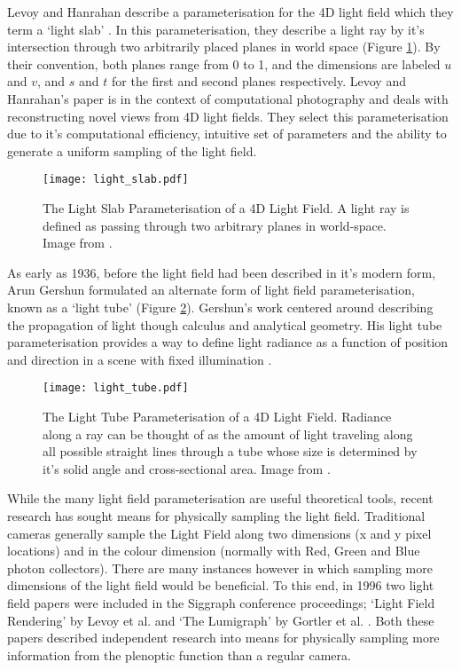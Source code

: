 Levoy and Hanrahan describe a parameterisation for the 4D light field which they term a \enquote*{light slab} \cite{levoy1996light}.
In this parameterisation, they describe a light ray by it's intersection through two arbitrarily placed planes in world space (Figure \ref{fig:light_slab}).
By their convention, both planes range from 0 to 1, and the dimensions are labeled $u$ and $v$, and $s$ and $t$ for the first and second planes respectively.
Levoy and Hanrahan's paper is in the context of computational photography and deals with reconstructing novel views from 4D light fields.
They select this parameterisation due to it's computational efficiency, intuitive set of parameters and the ability to generate a uniform sampling of the light field.

\begin{figure}[h]
\centering
\texttt{[image: light\_slab.pdf]}
\caption[The Light Slab Parameterisation of a 4D Light Field]{
The Light Slab Parameterisation of a 4D Light Field.
A light ray is defined as passing through two arbitrary planes in world-space.
Image from \cite{levoy1996light}.
}
\label{fig:light_slab}
\end{figure}

As early as 1936, before the light field had been described in it's modern form, Arun Gershun formulated an alternate form of light field parameterisation, known as a \enquote*{light tube} \cite{gershun1939light} (Figure \ref{fig:light_tube}).
Gershun's work centered around describing the propagation of light though calculus and analytical geometry.
His light tube parameterisation provides a way to define light radiance as a function of position and direction in a scene with fixed illumination \cite{levoy2010lectureslides}.

\begin{figure}[h]
\centering
\texttt{[image: light\_tube.pdf]}
\caption[The Light Tube Parameterisation of a 4D Light Field]{
The Light Tube Parameterisation of a 4D Light Field.
Radiance along a ray can be thought of as the amount of light traveling along all possible straight lines through a tube whose size is determined by it's solid angle and cross-sectional area.
Image from \cite{levoy2006light}.
}
\label{fig:light_tube}
\end{figure}

While the many light field parameterisation are useful theoretical tools, recent research has sought means for physically sampling the light field.
Traditional cameras generally sample the Light Field along two dimensions (x and y pixel locations) and in the colour dimension (normally with Red, Green and Blue photon collectors).
There are many instances however in which sampling more dimensions of the light field would be beneficial.
To this end, in 1996 two light field papers were included in the Siggraph conference proceedings; \enquote*{Light Field Rendering} by Levoy et al. and \enquote*{The Lumigraph} by Gortler et al. \cite{levoy1996light, gortler1996lumigraph}.
Both these papers described independent research into means for physically sampling more information from the plenoptic function than a regular camera.

